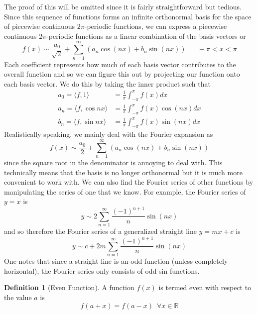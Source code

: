 \documentclass{report}
\theoremstyle{definition}
\newtheorem{definition}[theorem]{Definition}
\theoremstyle{remark}
\newcommand{\R}{\mathbb{R}}
\newcommand{\twen}{\hspace{20pt}}
\begin{document}
The proof of this will be omitted since it is fairly straightforward but tedious. Since this sequence of functions forms an infinite orthonormal basis for the space of piecewise  continuous $2\pi$-periodic functions, we can express a piecewise continuous $2\pi$-periodic functions as a linear combination of the basis vectors or 
\begin{equation*}
    f(x)\sim \frac{a_0}{\sqrt{2}} + \sum^\infty_{n=1} (a_n\cos(nx)+b_n\sin(nx)) \twen -\pi<x<\pi
\end{equation*}
Each coefficient represents how much of each basis vector contributes to the overall function and so we can figure this out by projecting our function onto each basis vector. We do this by taking the inner product such that 
\begin{equation*}
    \begin{split}
        a_0 = \langle f,1\rangle &= \frac{1}{\pi} \int^\pi_{-\pi}f(x)dx \\
        a_n = \langle f,\cos nx\rangle&=\frac{1}{\pi}\int^\pi_{-\pi}f(x)\cos (nx)dx \\
        b_n=\langle f, \sin nx\rangle &=\frac{1}{\pi}\int^\pi_{-\pi}f(x)\sin (nx)dx
    \end{split}
\end{equation*}
Realistically speaking, we mainly deal with the Fourier expansion as 
\begin{equation*}
    f(x)\sim \frac{a_0}{2} + \sum^\infty_{n=1} (a_n\cos(nx)+b_n\sin(nx))
\end{equation*}
since the square root in the denominator is annoying to deal with. This technically means that the basis is no longer orthonormal but it is much more convenient to work with. We can also find the Fourier series of other functions by manipulating the series of one that we know. For example, the Fourier series of $y=x$ is 
\begin{equation*}
    y \sim2\sum^\infty_{n=1}\frac{(-1)^{n+1}}{n}\sin(nx)
\end{equation*}
and so therefore the Fourier series of a generalized straight line $y=mx+c$ is 
\begin{equation*}
    y\sim c+2m\sum^\infty_{n=1}\frac{(-1)^{n+1}}{n}\sin(nx)
\end{equation*}
One notes that since a straight line is an odd function (unless completely horizontal), the Fourier series only consists of odd sin functions. 
\begin{definition} [Even Function]
    A function $f(x)$ is termed even with respect to the value $a$ is 
    \begin{equation*}
        f(a+x)=f(a-x) \,\,\, \forall x\in\R
    \end{equation*}
\end{definition}
\end{document}
